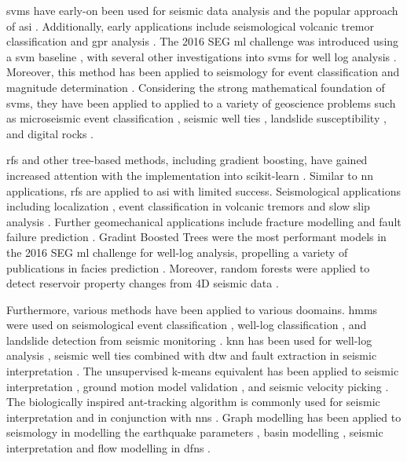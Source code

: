 \aclp{svm} have early-on been used for seismic data analysis \citep{Li2004-fk} and the popular approach of \acl{asi} \citep{Liu2015-pf,di2017seismic,Mardan2017-vr}. Additionally, early applications include seismological volcanic tremor classification \citep{Masotti2006-fi,Masotti2008-tu} and \acl{gpr} analysis \citep{pasolli2009automatic, Xie2013-fh}. The 2016 SEG \ac{ml} challenge was introduced using a \ac{svm} baseline \citep{Hall2016-xh}, with several other investigations into \acp{svm} for well log analysis \citep{anifowose2017carbonate, Cate2018-mb, Gupta2018-ut, Saporetti2018-sq}. Moreover, this method has been applied to seismology for event classification \citep{Malfante2018-yl} and magnitude determination \citep{Ochoa2018-wp}. Considering the strong mathematical foundation of \acp{svm}, they have been applied to applied to a variety of geoscience problems such as microseismic event classification \citep{Zhao2017-rx}, seismic well ties \citep{Chaki2018-mr}, landslide susceptibility \citep{Marjanovic2011-ot,Ballabio2012-xv}, and digital rocks \citep{Ma2012-qo}.

\aclp{rf} and other tree-based methods, including gradient boosting, have gained increased attention with the implementation into scikit-learn \citep{sklearn_api}. Similar to \ac{nn} applications, \acp{rf} are applied to \acl{asi} \citep{Guillen2015-re} with limited success. Seismological applications including localization \citep{Dodge2016-ah}, event classification in volcanic tremors \citep{Maggi2017-mr} and slow slip analysis \citep{Hulbert2018-xe}. Further geomechanical applications include fracture modelling \citep{Valera2017-yl} and fault failure prediction \citep{RouetLeduc2017-li,RouetLeduc2018-vd}. Gradint Boosted Trees were the most performant models in the 2016 SEG \ac{ml} challenge \citep{Hall2017-fk} for well-log analysis, propelling a variety of publications in facies prediction \citep{Bestagini2017-nh,Blouin2017-gt,Cate2018-mb,Saporetti2018-sq}. Moreover, random forests were applied to detect reservoir property changes from 4D seismic data \citep{Cao2017-gp}.

Furthermore, various methods have been applied to various doomains. \aclp{hmm} were used on seismological event classification \citep{Ohrnberger2001-cq,Beyreuther2008-mz, Bicego2013-ox}, well-log classification \citep{Jeong2014-jy, Wang2017-gi}, and landslide detection from seismic monitoring \citep{Dammeier2016-mf}. \ac{knn} has been used for well-log analysis \citep{Cate2017-na,Saporetti2018-sq}, seismic well ties \citep{Wang2017-lw} combined with \ac{dtw} and fault extraction in seismic interpretation \citep{hale2013methods}. The unsupervised k-means equivalent has been applied to seismic interpretation \citep{Di2017-qn}, ground motion model validation \citep{Khoshnevis2018-wq}, and seismic velocity picking \citep{Wei2018-nm}. The biologically inspired ant-tracking algorithm is commonly used for seismic interpretation \citep{Pedersen2002-de} and in conjunction with \acp{nn} \citep{Zheng2014-il}. Graph modelling has been applied to seismology in modelling the earthquake parameters \citep{Kuehn2011-tv}, basin modelling \citep{Martinelli2013-ch}, seismic interpretation \citep{Ferreira2018-gr} and flow modelling in \acp{dfn} \citep{Karra2018-of}.

